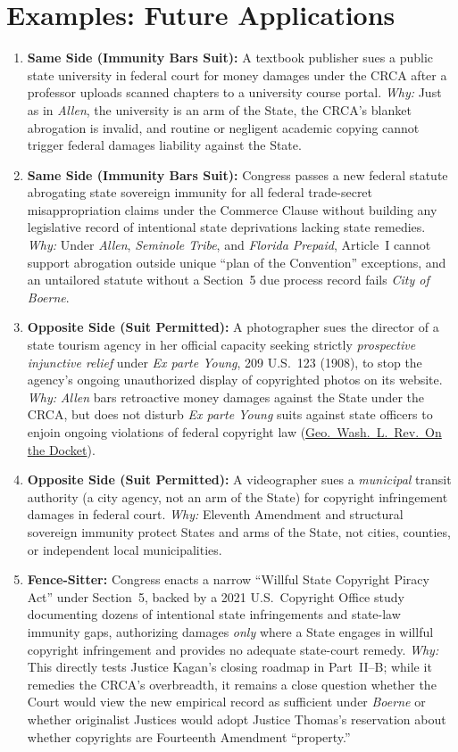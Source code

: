 \documentclass[12pt]{article}
\begin{document}
\section{Examples: Future Applications}
\begin{enumerate}
  \item \textbf{Same Side (Immunity Bars Suit):} A textbook publisher sues a public state university in federal court for money damages under the CRCA after a professor uploads scanned chapters to a university course portal. \textit{Why:} Just as in \textit{Allen}, the university is an arm of the State, the CRCA's blanket abrogation is invalid, and routine or negligent academic copying cannot trigger federal damages liability against the State.
  \item \textbf{Same Side (Immunity Bars Suit):} Congress passes a new federal statute abrogating state sovereign immunity for all federal trade-secret misappropriation claims under the Commerce Clause without building any legislative record of intentional state deprivations lacking state remedies. \textit{Why:} Under \textit{Allen}, \textit{Seminole Tribe}, and \textit{Florida Prepaid}, Article~I cannot support abrogation outside unique ``plan of the Convention'' exceptions, and an untailored statute without a Section~5 due process record fails \textit{City of Boerne}.
  \item \textbf{Opposite Side (Suit Permitted):} A photographer sues the director of a state tourism agency in her official capacity seeking strictly \textit{prospective injunctive relief} under \textit{Ex parte Young}, 209 U.S.\ 123 (1908), to stop the agency's ongoing unauthorized display of copyrighted photos on its website. \textit{Why:} \textit{Allen} bars retroactive money damages against the State under the CRCA, but does not disturb \textit{Ex parte Young} suits against state officers to enjoin ongoing violations of federal copyright law (\href{https://www.gwlr.org/allen-v-cooper-states-stay-copyright-pirates/}{Geo.\ Wash.\ L.\ Rev.\ On the Docket}).
  \item \textbf{Opposite Side (Suit Permitted):} A videographer sues a \textit{municipal} transit authority (a city agency, not an arm of the State) for copyright infringement damages in federal court. \textit{Why:} Eleventh Amendment and structural sovereign immunity protect States and arms of the State, not cities, counties, or independent local municipalities.
  \item \textbf{Fence-Sitter:} Congress enacts a narrow ``Willful State Copyright Piracy Act'' under Section~5, backed by a 2021 U.S.\ Copyright Office study documenting dozens of intentional state infringements and state-law immunity gaps, authorizing damages \textit{only} where a State engages in willful copyright infringement and provides no adequate state-court remedy. \textit{Why:} This directly tests Justice Kagan's closing roadmap in Part~II--B; while it remedies the CRCA's overbreadth, it remains a close question whether the Court would view the new empirical record as sufficient under \textit{Boerne} or whether originalist Justices would adopt Justice Thomas's reservation about whether copyrights are Fourteenth Amendment ``property.''
\end{enumerate}
\end{document}
